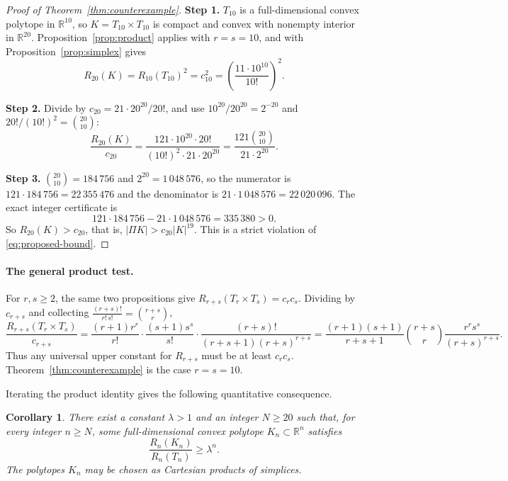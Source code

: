 \documentclass[11pt]{article}
\newtheorem{corollary}[theorem]{Corollary}
\newcommand{\R}{\mathbb R}
\newcommand{\step}[1]{\smallskip\noindent\textbf{#1}}
\begin{document}
\begin{proof}[Proof of Theorem~\ref{thm:counterexample}]
\step{Step 1.} \(T_{10}\) is a full-dimensional convex polytope in
\(\R^{10}\), so \(K=T_{10}\times T_{10}\) is compact and convex with
nonempty interior in \(\R^{20}\). Proposition~\ref{prop:product} applies
with \(r=s=10\), and with Proposition~\ref{prop:simplex} gives
\[
 R_{20}(K)=R_{10}(T_{10})^2=c_{10}^2
         =\left(\frac{11\cdot10^{10}}{10!}\right)^2.
\]

\step{Step 2.} Divide by \(c_{20}=21\cdot20^{20}/20!\), and use
\(10^{20}/20^{20}=2^{-20}\) and \(20!/(10!)^2=\binom{20}{10}\):
\[
 \frac{R_{20}(K)}{c_{20}}
 =\frac{121\cdot10^{20}\cdot20!}
        {(10!)^2\cdot21\cdot20^{20}}
 =\frac{121\binom{20}{10}}{21\cdot2^{20}}.
\]

\step{Step 3.} \(\binom{20}{10}=184\,756\) and \(2^{20}=1\,048\,576\), so
the numerator is \(121\cdot184\,756=22\,355\,476\) and the denominator is
\(21\cdot1\,048\,576=22\,020\,096\). The exact integer certificate is
\[
 121\cdot184\,756-21\cdot1\,048\,576=335\,380>0.
\]
So \(R_{20}(K)>c_{20}\), that is, \(|\Pi K|>c_{20}|K|^{19}\). This is a
strict violation of \eqref{eq:proposed-bound}.
\end{proof}

\paragraph{The general product test.}
For \(r,s\ge2\), the same two propositions give
\(R_{r+s}(T_r\times T_s)=c_rc_s\). Dividing by \(c_{r+s}\) and collecting
\(\frac{(r+s)!}{r!\,s!}=\binom{r+s}{r}\),
\[
 \frac{R_{r+s}(T_r\times T_s)}{c_{r+s}}
 =\frac{(r+1)r^r}{r!}\cdot\frac{(s+1)s^s}{s!}\cdot
  \frac{(r+s)!}{(r+s+1)(r+s)^{r+s}}
 =\frac{(r+1)(s+1)}{r+s+1}
   \binom{r+s}{r}\frac{r^rs^s}{(r+s)^{r+s}}.
\]
Thus any universal upper constant for \(R_{r+s}\) must be at least
\(c_rc_s\). Theorem~\ref{thm:counterexample} is the case \(r=s=10\).

\medskip
Iterating the product identity gives the following quantitative
consequence.

\begin{corollary}\label{cor:exponential-excess}
There exist a constant \(\lambda>1\) and an integer \(N\ge20\) such that,
for every integer \(n\ge N\), some full-dimensional convex polytope
\(K_n\subset\R^n\) satisfies
\[
 \frac{R_n(K_n)}{R_n(T_n)}\ge\lambda^n.
\]
The polytopes \(K_n\) may be chosen as Cartesian products of simplices.
\end{corollary}
\end{document}
